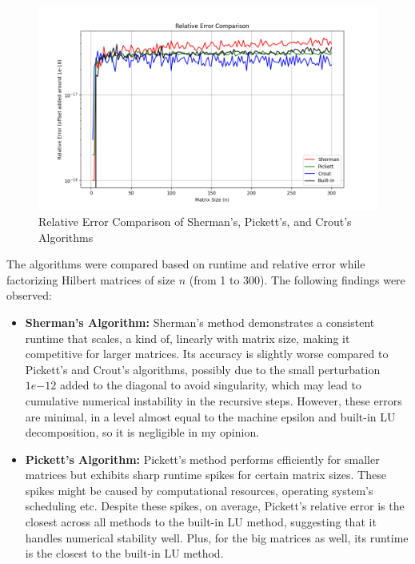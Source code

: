 \documentclass[11pt,a4paper, margin=1in]{article}
\begin{document}
\begin{enumerate}
    \begin{figure}[H]
        \centering
        \includegraphics[width=1\textwidth]{error_comparison.png}
        \caption{Relative Error Comparison of Sherman's, Pickett's, and Crout's Algorithms}
        \label{fig:relative_error}
    \end{figure}
    
    The algorithms were compared based on runtime and relative error while factorizing Hilbert matrices of size \( n \) (from 1 to 300). The following findings were observed:
    
    \begin{itemize}
        \item \textbf{Sherman's Algorithm:} 
        Sherman's method demonstrates a consistent runtime that scales, a kind of, linearly with matrix size, making it competitive for larger matrices. Its accuracy is slightly worse compared to Pickett's and Crout's algorithms, possibly due to the small perturbation \( 1e{-12} \) added to the diagonal to avoid singularity, which may lead to cumulative numerical instability in the recursive steps. However, these errors are minimal, in a level almost equal to the machine epsilon and built-in LU decomposition, so it is negligible in my opinion.
        
        \item \textbf{Pickett's Algorithm:} 
        Pickett's method performs efficiently for smaller matrices but exhibits sharp runtime spikes for certain matrix sizes. These spikes might be caused by computational resources, operating system's scheduling etc. Despite these spikes, on average, Pickett's relative error is the closest across all methods to the built-in LU method, suggesting that it handles numerical stability well. Plus, for the big matrices as well, its runtime is the closest to the built-in LU method.


\end{itemize}
\end{enumerate}
\end{document}
